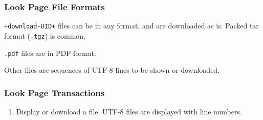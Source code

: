 \documentclass[12pt]{article}
\newenvironment{indpar}[1][0.4in]%
	{\begin{list}{}%
		     {\setlength{\itemsep}{0in}%
		      \setlength{\topsep}{0in}%
		      \setlength{\parsep}{1ex}%
		      \setlength{\labelwidth}{#1}%
		      \setlength{\leftmargin}{#1}%
		      \addtolength{\leftmargin}{\labelsep}}%
	 \item}%
	{\end{list}}
\begin{document}
\subsubsection{Look Page File Formats}

\begin{indpar}
{\tt +download-UID+} files can be in any format, and are downloaded
as is.  Packed tar format ({\tt .tgz}) is common.

{\tt .pdf} files are in PDF format.

Other files are sequences of UTF-8 lines to be shown or downloaded.
\end{indpar}

\subsubsection{Look Page Transactions}

\begin{enumerate}
\item Display or download a file.  UTF-8 files are displayed with
line numbers.
\end{enumerate}
\end{document}
